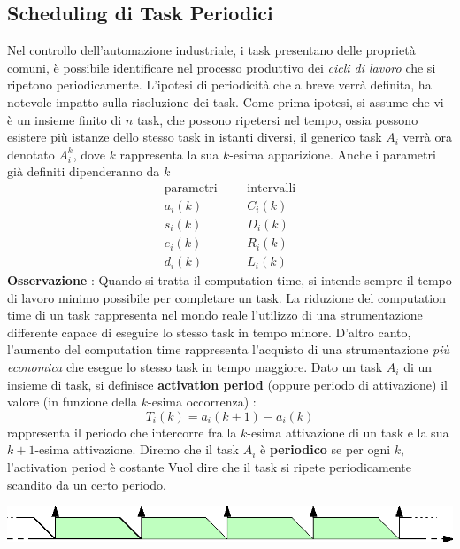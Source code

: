 \documentclass[10pt, letterpaper]{report}
\begin{document}
\subsection{Scheduling di Task Periodici}
Nel controllo dell'automazione industriale, i task presentano delle proprietà comuni, è possibile 
identificare nel processo produttivo dei \textit{cicli di lavoro} che si ripetono periodicamente. L'ipotesi 
di periodicità che a breve verrà definita, ha notevole impatto sulla risoluzione dei task. 
Come prima ipotesi, si assume che vi è un insieme finito di $n$ task, che possono ripetersi nel tempo, 
ossia possono esistere più istanze dello stesso task in istanti diversi, il generico task $A_i$ verrà 
ora denotato $A_i^k$, dove $k$ rappresenta la sua $k$-esima apparizione. Anche i parametri già definiti 
dipenderanno da $k$ 
$$ \begin{matrix}
    \text{parametri}&&&\text{intervalli}\\
    a_i(k) & & & C_i(k) \\ 
    s_i(k) && & D_i(k)\\
    e_i(k)&& & R_i(k)\\ 
    d_i(k)&& &L_i(k)
\end{matrix}$$
\textbf{Osservazione} : Quando si tratta il computation time, si intende sempre il tempo di lavoro minimo 
possibile per completare un task. La riduzione del computation time di un task rappresenta nel mondo reale 
l'utilizzo di una strumentazione differente capace di eseguire lo stesso task in tempo minore. D'altro canto, 
l'aumento del computation time rappresenta l'acquisto di una strumentazione \textit{più economica} 
che esegue lo stesso task in tempo maggiore.\acc
{} Dato un task $A_i$ di un insieme di task, si definisce \textbf{activation period} (oppure 
periodo di attivazione) il valore (in funzione della $k$-esima occorrenza) : 
$$ T_i(k)=a_i(k+1)-a_i(k)$$ 
rappresenta il periodo che intercorre fra la $k$-esima attivazione di un task e la sua $k+1$-esima 
attivazione. Diremo che il task $A_i$ è \textbf{periodico} se per ogni $k$, l'activation period è 
costante 
Vuol dire che il task si ripete periodicamente scandito da un certo periodo.\begin{center}
    \includegraphics[width=1\textwidth ]{images/taskPeriodico.eps}
\end{center}
\end{document}
